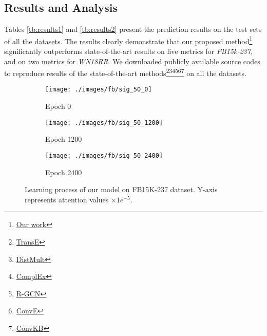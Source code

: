 \documentclass[11pt,a4paper]{article}
\begin{document}
\subsection{Results and Analysis}
\label{ssec:results}
Tables \ref{tb:results1} and \ref{tb:results2} present the prediction results on the test sets of all the datasets. 
The results clearly demonstrate that our proposed method\footnote{\href{https://github.com/deepakn97/relationPrediction}{Our work}} significantly outperforms state-of-the-art results on five metrics for \emph{FB15k-237}, and on two metrics for \emph{WN18RR}.  
We downloaded publicly available source codes to reproduce results of the state-of-the-art  methods\footnote{\href{https://github.com/datquocnguyen/STransE}{TransE}}\footnote{\href{https://github.com/TimDettmers/ConvE}{DistMult}}\footnote{\href{https://github.com/TimDettmers/ConvE}{ComplEx}}\footnote{\href{https://github.com/MichSchli/RelationPrediction}{R-GCN}}\footnote{\href{https://github.com/TimDettmers/ConvE}{ConvE}}\footnote{\href{https://github.com/daiquocnguyen/ConvKB}{ConvKB}} on all the datasets.
\begin{figure*}[t]
  \centering
  \hspace{-1.9cm}
  \begin{subfigure}[b]{0.2\linewidth}\label{hfb:a}
    \texttt{[image: ./images/fb/sig\_50\_0]}
    \caption{Epoch 0}
  \end{subfigure}
  \hspace{2.1cm}
  \begin{subfigure}[b]{0.2\linewidth}\label{hfb:c}
    \texttt{[image: ./images/fb/sig\_50\_1200]}
    \caption{Epoch 1200}
  \end{subfigure}
  \hspace{2.1cm}
  \begin{subfigure}[b]{0.2\linewidth}\label{hfb:e}
    \texttt{[image: ./images/fb/sig\_50\_2400]}
    \caption{Epoch 2400}
  \end{subfigure}
  \caption{Learning process of our model on FB15K-237 dataset. Y-axis represents attention values \(\times 1e^{-5}\).}
  \label{fig:theat_fb}
\end{figure*}
\end{document}
